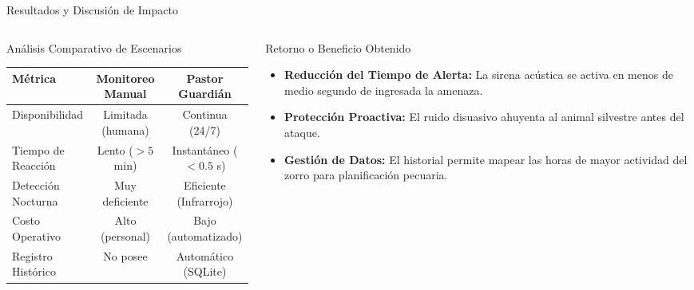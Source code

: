 \documentclass[10pt,aspectratio=169]{beamer}
\begin{document}
\begin{frame}{Resultados y Discusión de Impacto}
  \begin{columns}[T]
    \begin{column}{0.5\textwidth}
      \begin{block}{Análisis Comparativo de Escenarios}
        \centering
        \scriptsize
        \begin{tabular}{p{2.2cm}cc}
          \toprule
          \textbf{Métrica} & \textbf{Monitoreo Manual} & \textbf{Pastor Guardián} \\
          \midrule
          Disponibilidad & Limitada (humana) & Continua (24/7) \\
          Tiempo de Reacción & Lento ($>5$ min) & Instantáneo ($<0.5$ s) \\
          Detección Nocturna & Muy deficiente & Eficiente (Infrarrojo) \\
          Costo Operativo & Alto (personal) & Bajo (automatizado) \\
          Registro Histórico & No posee & Automático (SQLite) \\
          \bottomrule
        \end{tabular}
      \end{block}
    \end{column}
    
    \begin{column}{0.46\textwidth}
      \begin{block}{Retorno o Beneficio Obtenido}
        \small
        \begin{itemize}
          \item \textbf{Reducción del Tiempo de Alerta:} La sirena acústica se activa en menos de medio segundo de ingresada la amenaza.
          \item \textbf{Protección Proactiva:} El ruido disuasivo ahuyenta al animal silvestre antes del ataque.
          \item \textbf{Gestión de Datos:} El historial permite mapear las horas de mayor actividad del zorro para planificación pecuaria.
        \end{itemize}
      \end{block}
    \end{column}
  \end{columns}
\end{frame}
\end{document}
